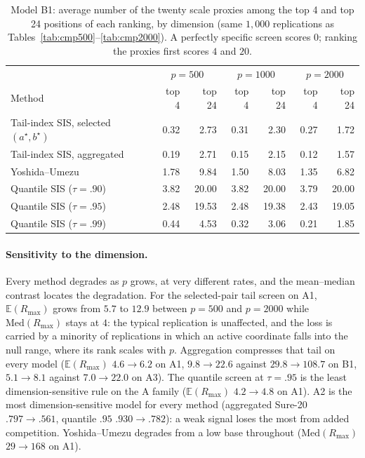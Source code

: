 \documentclass[bj,authoryear]{imsart}
\theoremstyle{plain}
\newcommand{\E}{\mathbb E}\newcommand{\R}{\mathbb R}
\begin{document}
\begin{table}[t]
\centering
\caption{Model B1: average number of the twenty scale proxies among the
top 4 and top 24 positions of each ranking, by dimension (same
$1{,}000$ replications as Tables~\ref{tab:cmp500}--\ref{tab:cmp2000}).
A perfectly specific screen scores $0$; ranking the proxies first
scores $4$ and $20$.}
\label{tab:b1comp}
\begin{tabular}{lrrrrrr}
\toprule
 & \multicolumn{2}{c}{$p=500$} & \multicolumn{2}{c}{$p=1000$}
 & \multicolumn{2}{c}{$p=2000$}\\
Method & top 4 & top 24 & top 4 & top 24 & top 4 & top 24\\
\midrule
Tail-index SIS, selected $(a^\star,b^\star)$ & 0.32 & 2.73 & 0.31 & 2.30 & 0.27 & 1.72\\
Tail-index SIS, aggregated & 0.19 & 2.71 & 0.15 & 2.15 & 0.12 & 1.57\\
Yoshida--Umezu & 1.78 & 9.84 & 1.50 & 8.03 & 1.35 & 6.82\\
Quantile SIS ($\tau=.90$) & 3.82 & 20.00 & 3.82 & 20.00 & 3.79 & 20.00\\
Quantile SIS ($\tau=.95$) & 2.48 & 19.53 & 2.48 & 19.38 & 2.43 & 19.05\\
Quantile SIS ($\tau=.99$) & 0.44 & 4.53 & 0.32 & 3.06 & 0.21 & 1.85\\
\bottomrule
\end{tabular}
\end{table}

\paragraph{Sensitivity to the dimension.}
Every method degrades as $p$ grows, at very different rates, and the
mean--median contrast locates the degradation. For the selected-pair
tail screen on A1, $\E(R_{\max})$ grows from $5.7$ to $12.9$ between
$p=500$ and $p=2000$ while $\mathrm{Med}(R_{\max})$ stays at $4$: the
typical replication is unaffected, and the loss is carried by a
minority of replications in which an active coordinate falls into the
null range, where its rank scales with $p$. Aggregation compresses that
tail on every model ($\E(R_{\max})$ $4.6\to6.2$ on A1, $9.8\to22.6$
against $29.8\to108.7$ on B1, $5.1\to8.1$ against $7.0\to22.0$ on A3).
The quantile screen at $\tau=.95$ is the least dimension-sensitive rule
on the A family ($\E(R_{\max})$ $4.2\to4.8$ on A1). A2 is the most
dimension-sensitive model for every method (aggregated Sure-20
$.797\to.561$, quantile $.95$ $.930\to.782$): a weak signal loses the
most from added competition. Yoshida--Umezu degrades from a low base
throughout ($\mathrm{Med}(R_{\max})$ $29\to168$ on A1).
\end{document}
